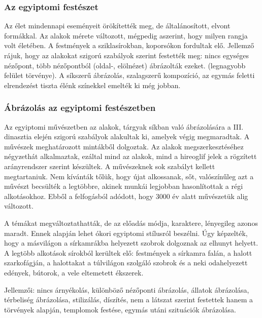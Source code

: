 	\subsubsection{Az egyiptomi festészet}
	
	Az élet mindennapi eseményeit örökítették meg, de általánosított, elvont formákkal. Az
	alakok mérete változott, mégpedig aszerint, hogy milyen rangja volt életében.
	A festmények a sziklasírokban, koporsókon fordultak elő. Jellemző rájuk, hogy az alakokat
	szigorú szabályok szerint festették meg: nincs egységes nézőpont, több nézőpontból (oldal-,
	elölnézet) ábrázolták ezeket. (legnagyobb felület törvénye). A síkszerű ábrázolás, szalagszerű
	kompozíció, az egymás feletti elrendezést tiszta élénk színekkel emelték ki még jobban. 
	
	
	\subsubsection{Ábrázolás az egyiptomi festészetben}
	
	Az egyiptomi művészetben az alakok, tárgyak síkban való ábrázolására a III. dinasztia elején szigorú szabályok alakultak ki, amelyek végig megmaradtak. A művészek meghatározott mintákből dolgoztak. Az alakok megszerkesztéséhez négyzethát alkalmaztak, ezáltal mind az alakok, mind a hireoglif jelek a rögzített arányrendszer szerint készültek. A művészeknek sok szabályt kellett megtartaniuk. Nem kívánták tőlük, hogy újat alkossanak, sőt, valószínűleg azt a művészt becsülték a legtöbbre, akinek munkái legjobban hasonlítottak a régi alkotásokhoz. Ebből a felfogásból adódott, hogy 3000 év alatt művészetük alig változott.
	
	A témákat megváltoztathatták, de az előadás módja, karaktere, lényegileg azonos maradt. Ennek alapján lehet ókori egyiptomi stílusról beszélni. Úgy képzelték, hogy a másvilágon a sírkamrákba helyezett szobrok dolgoznak az elhunyt helyett. A legtöbb alkotások sírokból kerültek elő: festmények a sírkamra falán, a halott szarkofágján, a halottakat a túlvilágon szolgáló szobrok és a neki odahelyezett edények, bútorok, a vele eltemetett ékszerek.
	
	Jellemzői: nincs árnyékolás, különböző nézőponti ábrázolás, állatok ábrázolása, térbeliség ábrázolása, stilizálás, díszítés, nem a látszat szerint festettek hanem a törvények alapján, templomok festése, egymás utáni szituációk ábrázolása.
	
	
